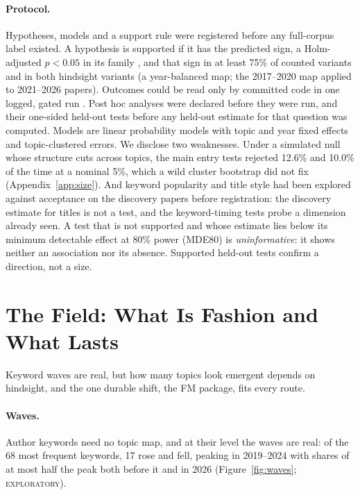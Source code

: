 \documentclass[11pt]{article}
\newcommand{\lab}[1]{\textsc{#1}}
\begin{document}
\paragraph{Protocol.}
Hypotheses, models and a support rule were registered before any full-corpus label existed. A hypothesis is
supported if it has the predicted sign, a Holm-adjusted $p<0.05$ in its family \citep{holm1979simple}, and that sign
in at least 75\% of counted variants and in both hindsight variants (a year-balanced map; the 2017--2020 map applied
to 2021--2026 papers). Outcomes could be read only by committed code in one logged, gated run
\citep{nosek2018preregistration,vandenakker2021preregistration}. Post hoc analyses were declared before they were
run, and their one-sided held-out tests before any held-out estimate for that question was computed. Models are linear probability models
with topic and year fixed effects and topic-clustered errors. We disclose two weaknesses. Under a simulated null
whose structure cuts across topics, the main entry tests rejected 12.6\% and 10.0\% of the time at a nominal 5\%,
which a wild cluster bootstrap \citep{cameron2008bootstrap} did not fix (Appendix~\ref{app:size}). And keyword
popularity and title style had been explored against acceptance on the discovery papers before registration: the
discovery estimate for titles is not a test, and the keyword-timing tests probe a dimension already seen. A test that is not
supported and whose estimate lies below its minimum detectable effect at 80\% power (MDE80) is \emph{uninformative}:
it shows neither an association nor its absence. Supported held-out tests confirm a direction, not a size.

\section{The Field: What Is Fashion and What Lasts}
\label{sec:field}

Keyword waves are real, but how many topics look emergent depends on hindsight, and the one durable shift, the FM
package, fits every route.

\paragraph{Waves.}
Author keywords need no topic map, and at their level the waves are real: of the 68 most frequent keywords, 17
rose and fell, peaking in 2019--2024 with shares of at most half the peak both before it and in 2026
(Figure~\ref{fig:waves}; \lab{exploratory}).
\end{document}

